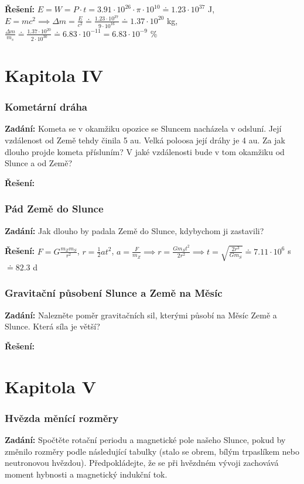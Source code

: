 \documentclass{article}
\begin{document}
\textbf{Řešení:} $E = W = P \cdot t = 3.91 \cdot 10^{26} \cdot \pi \cdot 10^{10} \doteq 1.23 \cdot 10^{37} $ J, $E = mc^2  \implies \Delta m = \frac{E}{c^2} \doteq \frac{1.23 \cdot 10^{37}}{9\cdot 10^{16}} \doteq 1.37 \cdot 10^{20}$ kg, $\frac{\Delta m}{m_s} \doteq \frac{1.37 \cdot 10^{20}}{2 \cdot 10^30} \doteq 6.83 \cdot 10^{-11} = 6.83 \cdot 10^{-9}$ \%

\part*{Kapitola \textrm{I\hspace{-.1em}V}}

\section*{Kometární dráha}
\textbf{Zadání:} Kometa se v okamžiku opozice se Sluncem nacházela v odsluní. Její vzdálenost od
Země tehdy činila 5 au. Velká poloosa její dráhy je 4 au. Za jak dlouho projde kometa přísluním?
V jaké vzdálenosti bude v tom okamžiku od Slunce a od Země?

\textbf{Řešení:}

\section*{Pád Země do Slunce}
\textbf{Zadání:} Jak dlouho by padala Země do Slunce, kdybychom ji zastavili?

\textbf{Řešení:} $F = G\frac{m_Zm_S}{r^2}$, $r = \frac{1}{2}at^2$, $a = \frac{F}{m_Z} \implies r = \frac{Gm_St^2}{2r^2} \implies t = \sqrt{\frac{2r^3}{Gm_S}} \doteq 7.11 \cdot 10^6$ s $\doteq 82.3$ d

\section*{Gravitační působení Slunce a Země na Měsíc}
\textbf{Zadání:}  Nalezněte poměr gravitačních sil, kterými působí na Měsíc Země a Slunce. Která síla je
větší?

\textbf{Řešení:}

\part*{Kapitola \textrm{V}}

\section*{Hvězda měnící rozměry}
\textbf{Zadání:} Spočtěte rotační periodu a magnetické pole našeho Slunce, pokud by změnilo rozměry
podle následující tabulky (stalo se obrem, bílým trpaslíkem nebo neutronovou hvězdou).
Předpokládejte, že se při hvězdném vývoji zachovává moment hybnosti a magnetický indukční
tok.
\end{document}
